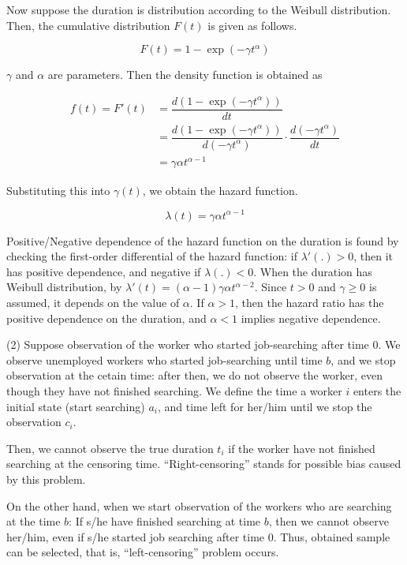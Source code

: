 \documentclass[dvipdfmx, 12pt]{article}
\begin{document}
Now suppose the duration is distribution according to the Weibull distribution. Then, the cumulative distribution $F(t)$ is given as follows.

\[
F(t) = 1 - \exp (- \gamma t^{\alpha})
\]

$\gamma$ and $\alpha$ are parameters. Then the density function is obtained as

\begin{align*}
  f(t) = F'(t) & = \dfrac{d (1 - \exp (- \gamma t^{\alpha}))}{dt} \\
  &= \dfrac{d (1 - \exp (- \gamma t^{\alpha}))}{d (- \gamma t^{\alpha})} \cdot \dfrac{d (- \gamma t^{\alpha})}{d t} \\
  & = \gamma \alpha t^{\alpha - 1}
\end{align*}

Substituting this into $\gamma(t)$, we obtain the hazard function.

\[
\lambda(t) = \gamma \alpha t^{\alpha - 1}
\]

Positive/Negative dependence of the hazard function on the duration is found by checking the first-order differential of the hazard function: if $\lambda' (.) > 0$, then it has positive dependence, and negative if $\lambda(.) < 0$. When the duration has Weibull distribution, by $\lambda'(t) = (\alpha - 1) \gamma \alpha t^{\alpha - 2}$. Since $t > 0$ and $\gamma \geq 0$ is assumed, it depends on the value of $\alpha$. If $\alpha > 1$, then the hazard ratio has the positive dependence on the duration, and $\alpha < 1$ implies negative dependence.

\vspace{1zw}

(2) Suppose observation of the worker who started job-searching after time 0. We observe unemployed workers who started job-searching until time $b$, and we stop observation at the cetain time: after then, we do not observe the worker, even though they have not finished searching. We define the time a worker $i$ enters the initial state (start searching) $a_i$, and time left for her/him until we stop the observation $c_i$.

Then, we cannot observe the true duration $t_i$ if the worker have not finished searching at the censoring time. ``Right-censoring'' stands for possible bias caused by this problem.

On the other hand, when we start observation of the workers who are searching at the time $b$: If s/he have finished searching at time $b$, then we cannot observe her/him, even if s/he started job searching after time $0$. Thus, obtained sample can be selected, that is, ``left-censoring'' problem occurs.
\end{document}
